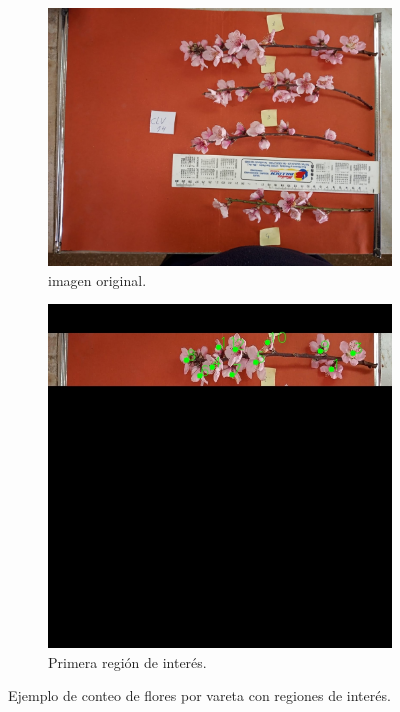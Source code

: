 \begin{figure}[ht]
     \centering
     \begin{subfigure}[b]{0.4\textwidth}
         \centering
         \includegraphics[scale=0.13]{./Figures/original.jpeg}
         \caption{imagen original.}
         \label{fig:1de34}
     \end{subfigure}
     \hfill
     \begin{subfigure}[b]{0.4\textwidth}
         \centering
         \includegraphics[scale=0.25]{./Figures/1stCount.jpeg}
         \caption{Primera región de interés.}
         \label{fig:2de34}
     \end{subfigure}
        \caption{Ejemplo de conteo de flores por vareta con regiones de interés.}
        \label{fig:regionInte}
\end{figure}

